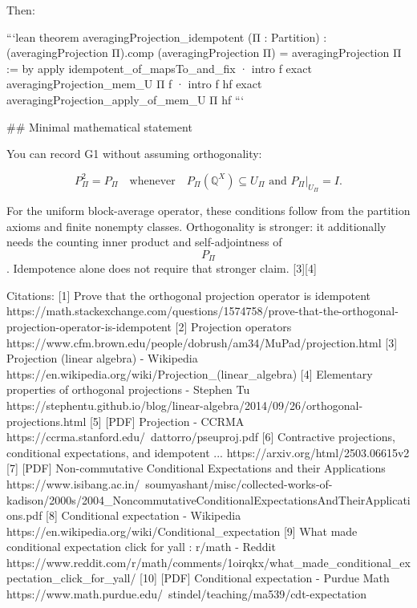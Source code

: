 Then:

```lean
theorem averagingProjection_idempotent (Π : Partition) :
    (averagingProjection Π).comp (averagingProjection Π)
      = averagingProjection Π := by
  apply idempotent_of_mapsTo_and_fix
  · intro f
    exact averagingProjection_mem_U Π f
  · intro f hf
    exact averagingProjection_apply_of_mem_U Π hf
```

## Minimal mathematical statement

You can record G1 without assuming orthogonality:

$$
\boxed{
P_\Pi^2=P_\Pi
\quad\text{whenever}\quad
P_\Pi(\mathbb Q^X)\subseteq U_\Pi
\text{ and }
P_\Pi|_{U_\Pi}=I.
}
$$

For the uniform block-average operator, these conditions follow from the partition axioms and finite nonempty classes. Orthogonality is stronger: it additionally needs the counting inner product and self-adjointness of $$P_\Pi$$. Idempotence alone does not require that stronger claim. [3][4]

Citations:
[1] Prove that the orthogonal projection operator is idempotent https://math.stackexchange.com/questions/1574758/prove-that-the-orthogonal-projection-operator-is-idempotent
[2] Projection operators https://www.cfm.brown.edu/people/dobrush/am34/MuPad/projection.html
[3] Projection (linear algebra) - Wikipedia https://en.wikipedia.org/wiki/Projection_(linear_algebra)
[4] Elementary properties of orthogonal projections - Stephen Tu https://stephentu.github.io/blog/linear-algebra/2014/09/26/orthogonal-projections.html
[5] [PDF] Projection - CCRMA https://ccrma.stanford.edu/~dattorro/pseuproj.pdf
[6] Contractive projections, conditional expectations, and idempotent ... https://arxiv.org/html/2503.06615v2
[7] [PDF] Non-commutative Conditional Expectations and their Applications https://www.isibang.ac.in/~soumyashant/misc/collected-works-of-kadison/2000s/2004_NoncommutativeConditionalExpectationsAndTheirApplications.pdf
[8] Conditional expectation - Wikipedia https://en.wikipedia.org/wiki/Conditional_expectation
[9] What made conditional expectation click for yall : r/math - Reddit https://www.reddit.com/r/math/comments/1oirqkx/what_made_conditional_expectation_click_for_yall/
[10] [PDF] Conditional expectation - Purdue Math https://www.math.purdue.edu/~stindel/teaching/ma539/cdt-expectation


